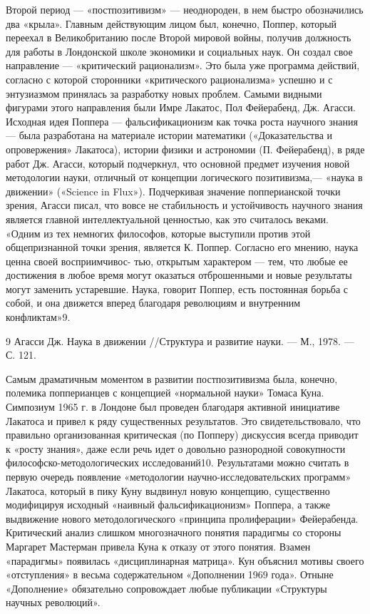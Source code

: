 \documentclass[11pt,a4paper]{article}
\begin{document}
Второй период — «постпозитивизм» — неоднороден, в нем быстро обозначились два
«крыла». Главным действующим лицом был, конечно, Поппер, который переехал в
Великобританию после Второй мировой войны, получив должность для работы в
Лондонской школе экономики и социальных наук. Он создал свое направление —
«критический рационализм». Это была уже программа действий, согласно с которой
сторонники «критического рационализма» успешно и с энтузиазмом принялась за
разработку новых проблем. Самыми видными фигурами этого направления были Имре
Лакатос, Пол Фейерабенд, Дж. Агасси.  Исходная идея Поппера —
фальсификационизм как точка роста научного знания — была разработана на
материале истории математики («Доказательства и опровержения» Лакатоса),
истории физики и астрономии (П. Фейерабенд), в ряде работ Дж. Агасси,
который подчеркнул, что основной предмет изучения новой методологии науки,
отличный от концепции логического позитивизма,— «наука в движении» («Science
in Flux»). Подчеркивая значение попперианской точки зрения, Агасси писал,
что вовсе не стабильность и устойчивость научного знания является главной
интеллектуальной ценностью, как это считалось веками. «Одним из тех немногих
философов, которые выступили против этой общепризнанной точки зрения,
является К. Поппер. Согласно его мнению, наука ценна своей восприимчивос-
тью, открытым характером — тем, что любые ее достижения в любое время могут
оказаться отброшенными и новые результаты могут заменить устаревшие. Наука,
говорит Поппер, есть постоянная борьба с собой, и она движется вперед
благодаря революциям и внутренним конфликтам»9.

9 Агасси Дж. Наука в движении //Структура и развитие науки. — М., 1978. —
С. 121.

Самым драматичным моментом в развитии постпозитивизма была, конечно,
полемика попперианцев с концепцией «нормальной науки» Томаса Куна. Симпозиум
1965 г. в Лондоне был проведен благодаря активной инициативе Лакатоса и привел
к ряду существенных результатов. Это свидетельствовало, что правильно
организованная критическая (по Попперу) дискуссия всегда приводит к «росту
знания», даже если речь идет о довольно разнородной совокупности
философско-методологических исследований10. Результатами можно считать в
первую очередь появление «методологии научно-исследовательских программ»
Лакатоса, который в пику Куну выдвинул новую концепцию, существенно
модифицируя исходный «наивный фальсификационизм» Поппера, а также выдвижение
нового методологического «принципа пролиферации» Фейерабенда. Критический
анализ слишком многозначного понятия парадигмы со стороны Маргарет Мастерман
привела Куна к отказу от этого понятия. Взамен «парадигмы» появилась
«дисциплинарная матрица». Кун объяснил мотивы своего «отступления» в весьма
содержательном «Дополнении 1969 года». Отныне «Дополнение» обязательно
сопровождает любые публикации «Структуры научных революций».
\end{document}
